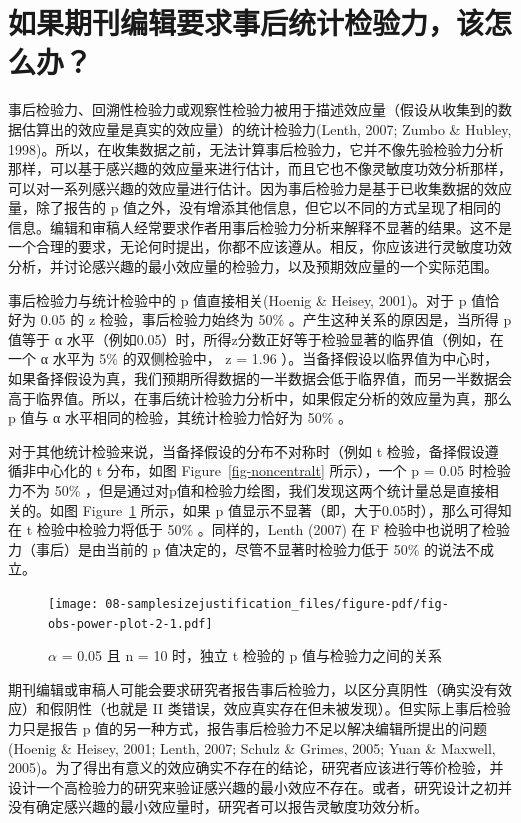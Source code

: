 \documentclass[
  letterpaper,
  DIV=11,
  numbers=noendperiod]{scrreprt}
\begin{document}
\hypertarget{sec-posthocpower}{%
\section{如果期刊编辑要求事后统计检验力，该怎么办？}\label{sec-posthocpower}}

事后检验力、回溯性检验力或观察性检验力被用于描述效应量（假设从收集到的数据估算出的效应量是真实的效应量）的统计检验力(Lenth,
2007; Zumbo \& Hubley,
1998)。所以，在收集数据之前，无法计算事后检验力，它并不像先验检验力分析那样，可以基于感兴趣的效应量来进行估计，而且它也不像灵敏度功效分析那样，可以对一系列感兴趣的效应量进行估计。因为事后检验力是基于已收集数据的效应量，除了报告的
p
值之外，没有增添其他信息，但它以不同的方式呈现了相同的信息。编辑和审稿人经常要求作者用事后检验力分析来解释不显著的结果。这不是一个合理的要求，无论何时提出，你都不应该遵从。相反，你应该进行灵敏度功效分析，并讨论感兴趣的最小效应量的检验力，以及预期效应量的一个实际范围。

事后检验力与统计检验中的 p 值直接相关(Hoenig \& Heisey, 2001)。对于 p
值恰好为 0.05 的 z 检验，事后检验力始终为 50\%
。产生这种关系的原因是，当所得 p 值等于 α
水平（例如0.05）时，所得z分数正好等于检验显著的临界值（例如，在一个 α
水平为 5\% 的双侧检验中， z = 1.96
）。当备择假设以临界值为中心时，如果备择假设为真，我们预期所得数据的一半数据会低于临界值，而另一半数据会高于临界值。所以，在事后统计检验力分析中，如果假定分析的效应量为真，那么
p 值与 α 水平相同的检验，其统计检验力恰好为 50\% 。

对于其他统计检验来说，当备择假设的分布不对称时（例如 t
检验，备择假设遵循非中心化的 t 分布，如图 Figure~\ref{fig-noncentralt}
所示），一个 p = 0.05 时检验力不为 50\%
，但是通过对p值和检验力绘图，我们发现这两个统计量总是直接相关的。如图
Figure~\ref{fig-obs-power-plot-2} 所示，如果 p
值显示不显著（即，大于0.05时），那么可得知在 t 检验中检验力将低于 50\%
。同样的，Lenth (2007) 在 F 检验中也说明了检验力（事后）是由当前的 p
值决定的，尽管不显著时检验力低于 50\% 的说法不成立。

\begin{figure}

{\centering \texttt{[image: 08-samplesizejustification\_files/figure-pdf/fig-obs-power-plot-2-1.pdf]}

}

\caption{\label{fig-obs-power-plot-2}\(\alpha\) = 0.05 且 n = 10
时，独立 t 检验的 p 值与检验力之间的关系}

\end{figure}

期刊编辑或审稿人可能会要求研究者报告事后检验力，以区分真阴性（确实没有效应）和假阴性（也就是
II 类错误，效应真实存在但未被发现）。但实际上事后检验力只是报告 p
值的另一种方式，报告事后检验力不足以解决编辑所提出的问题(Hoenig \&
Heisey, 2001; Lenth, 2007; Schulz \& Grimes, 2005; Yuan \& Maxwell,
2005)。为了得出有意义的效应确实不存在的结论，研究者应该进行等价检验，并设计一个高检验力的研究来验证感兴趣的最小效应不存在。或者，研究设计之初并没有确定感兴趣的最小效应量时，研究者可以报告灵敏度功效分析。
\end{document}
